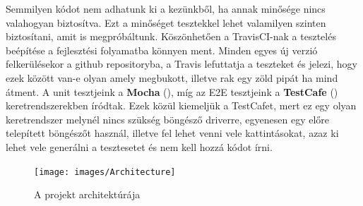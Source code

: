 Semmilyen kódot nem adhatunk ki a kezünkből, ha annak minősége nincs valahogyan biztosítva. Ezt a minőséget tesztekkel lehet valamilyen szinten biztosítani, amit is megpróbáltunk. Köszönhetően a TravisCI-nak a tesztelés beépítése a fejlesztési folyamatba könnyen ment. Minden egyes új verzió felkerülésekor a github repositoryba, a Travis lefuttatja a teszteket és jelezi, hogy ezek között van-e olyan amely megbukott, illetve rak egy zöld pipát ha mind átment. A unit tesztjeink a \textbf{Mocha} (\cite{soft:mocha}), míg az E2E tesztjeink a \textbf{TestCafe} (\cite{soft:testcafe}) keretrendszerekben íródtak. Ezek közül kiemeljük a TestCafet, mert ez egy olyan keretrendszer melynél nincs szükség böngésző driverre, egyenesen egy előre telepített böngészőt használ, illetve fel lehet venni vele kattintásokat, azaz ki lehet vele generálni a tesztesetet és nem kell hozzá kódot írni.

\begin{figure}[ht!]
	\centering
	\texttt{[image: images/Architecture]}
	\caption{A projekt architektúrája}
	\label{fig:Architecture}
\end{figure}
